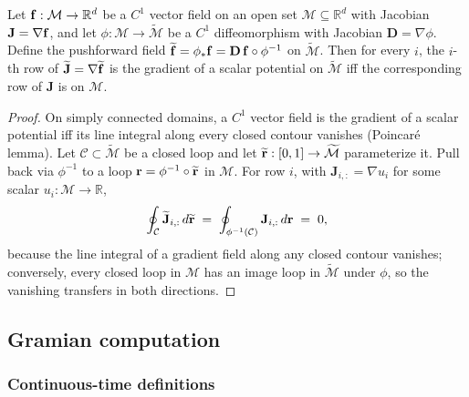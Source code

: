 \begin{proposition}\label{prop:supp-interareal-control-transfer}
Let $\vb{f}:\mathcal{M}\to\mathbb{R}^{d}$ be a $C^{1}$ vector field on an open set $\mathcal{M}\subseteq\mathbb{R}^{d}$ with Jacobian $\mathbf{J}=\nabla\vb{f}$, and let $\phi:\mathcal{M}\to\widetilde{\mathcal{M}}$ be a $C^{1}$ diffeomorphism with Jacobian $\mathbf{D}=\nabla\phi$. Define the pushforward field $\widetilde{\vb{f}}=\phi_{*}\vb{f}=\mathbf{D}\,\vb{f}\circ\phi^{-1}$ on $\widetilde{\mathcal{M}}$. Then for every $i$, the $i$-th row of $\widetilde{\mathbf{J}}=\nabla\widetilde{\vb{f}}$ is the gradient of a scalar potential on $\widetilde{\mathcal{M}}$ iff the corresponding row of $\mathbf{J}$ is on $\mathcal{M}$.
\end{proposition}
\begin{proof}
On simply connected domains, a $C^{1}$ vector field is the gradient of a scalar potential iff its line integral along every closed contour vanishes (Poincar\'e lemma). Let $\mathcal{C}\subset\widetilde{\mathcal{M}}$ be a closed loop and let $\widetilde{\vb{r}}:[0,1]\to\widetilde{\mathcal{M}}$ parameterize it. Pull back via $\phi^{-1}$ to a loop $\vb{r}=\phi^{-1}\circ\widetilde{\vb{r}}$ in $\mathcal{M}$. For row $i$, with $\mathbf{J}_{i,:}=\nabla u_{i}$ for some scalar $u_{i}:\mathcal{M}\to\mathbb{R}$,
\begin{equation}
\oint_{\mathcal{C}}\widetilde{\mathbf{J}}_{i,:}\,d\widetilde{\vb{r}} \;=\; \oint_{\phi^{-1}(\mathcal{C})}\mathbf{J}_{i,:}\,d\vb{r} \;=\; 0,
\end{equation}
because the line integral of a gradient field along any closed contour vanishes; conversely, every closed loop in $\mathcal{M}$ has an image loop in $\widetilde{\mathcal{M}}$ under $\phi$, so the vanishing transfers in both directions.
\end{proof}

\subsection{Gramian computation}\label{supp:interareal-control-gramian}

\subsubsection{Continuous-time definitions}\label{supp:interareal-control-gramian-defs}

